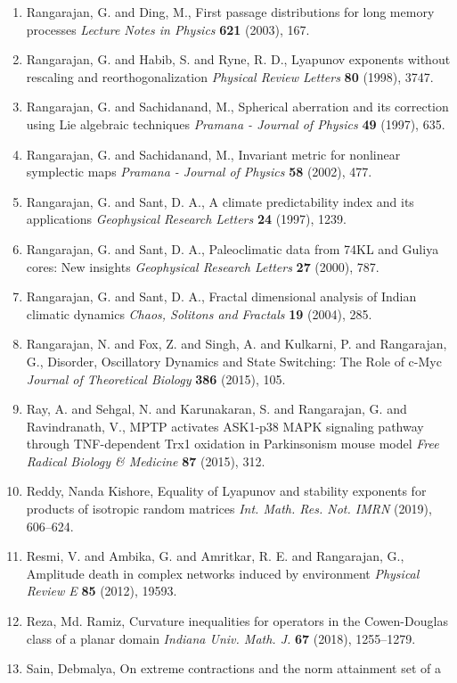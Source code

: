 \begin{enumerate}
\item Rangarajan, G. and Ding, M., First passage distributions for long memory processes {\em Lecture Notes in Physics} {\bf 621} (2003), 167.
\item Rangarajan, G. and Habib, S. and Ryne, R. D., Lyapunov exponents without rescaling and reorthogonalization {\em Physical Review Letters} {\bf 80} (1998), 3747.
\item Rangarajan, G. and Sachidanand, M., Spherical aberration and its correction using Lie algebraic techniques {\em Pramana - Journal of Physics} {\bf 49} (1997), 635.
\item Rangarajan, G. and Sachidanand, M., Invariant metric for nonlinear symplectic maps {\em Pramana - Journal of Physics} {\bf 58} (2002), 477.
\item Rangarajan, G. and Sant, D. A., A climate predictability index and its applications {\em Geophysical Research Letters} {\bf 24} (1997), 1239.
\item Rangarajan, G. and Sant, D. A., Paleoclimatic data from 74KL and Guliya cores: New insights {\em Geophysical Research Letters} {\bf 27} (2000), 787.
\item Rangarajan, G. and Sant, D. A., Fractal dimensional analysis of Indian climatic dynamics {\em Chaos, Solitons and Fractals} {\bf 19} (2004), 285.
\item Rangarajan, N. and Fox, Z. and Singh, A. and Kulkarni, P. and Rangarajan, G., Disorder, Oscillatory Dynamics and State Switching: The Role of c-Myc {\em Journal of Theoretical Biology} {\bf 386} (2015), 105.
\item Ray, A. and Sehgal, N. and Karunakaran, S. and Rangarajan, G. and  Ravindranath, V., MPTP activates ASK1-p38 MAPK signaling pathway through TNF-dependent Trx1 oxidation in Parkinsonism mouse model {\em Free Radical Biology & Medicine} {\bf 87} (2015), 312.
\item Reddy, Nanda Kishore, Equality of {L}yapunov and stability exponents for products of
isotropic random matrices {\em Int. Math. Res. Not. IMRN} {\bf } (2019), 606--624.
\item Resmi, V. and Ambika, G. and Amritkar, R. E. and Rangarajan, G., Amplitude death in complex networks induced by environment {\em Physical Review E} {\bf 85} (2012), 19593.
\item Reza, Md. Ramiz, Curvature inequalities for operators in the {C}owen-{D}ouglas
class of a planar domain {\em Indiana Univ. Math. J.} {\bf 67} (2018), 1255--1279.
\item Sain, Debmalya, On extreme contractions and the norm attainment set of a

\end{enumerate}
